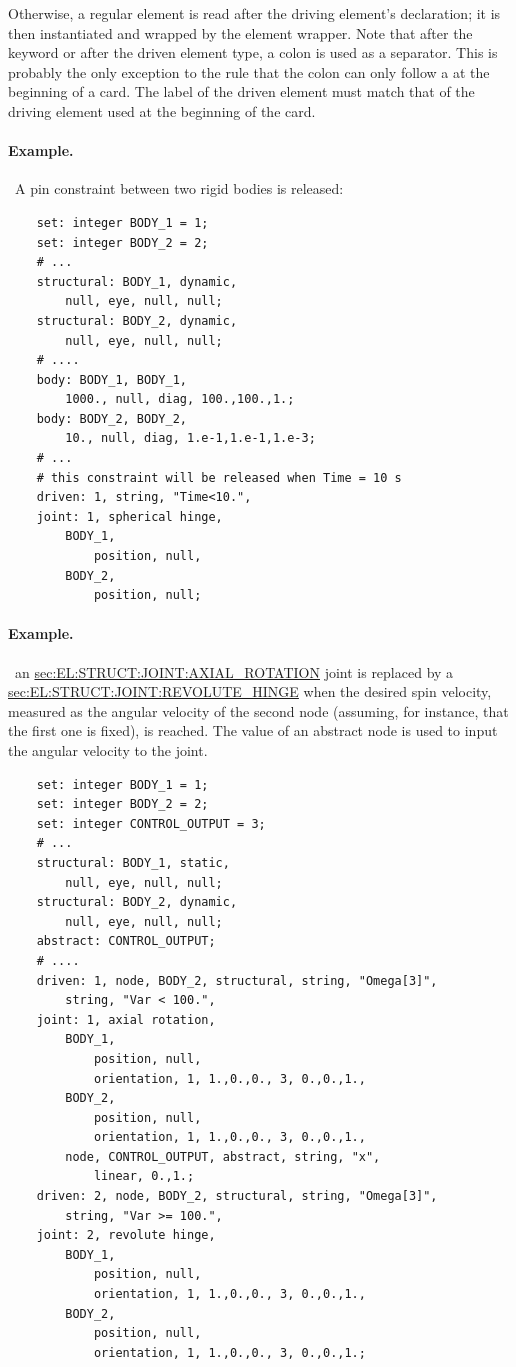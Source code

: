 Otherwise, a regular element is read after the driving element's declaration;
it is then instantiated and wrapped by the  element wrapper.
Note that after the keyword  or after the driven element type,
a colon is used as a separator.
This is probably the only exception to the rule that the colon
can only follow a  at the beginning of a card.
The label  of the driven element must match that
of the driving element used at the beginning of the  card.

\paragraph{Example.} \
A pin constraint between two rigid bodies is released:
\begin{verbatim}
    set: integer BODY_1 = 1;
    set: integer BODY_2 = 2;
    # ...
    structural: BODY_1, dynamic,
        null, eye, null, null;
    structural: BODY_2, dynamic,
        null, eye, null, null;
    # ....
    body: BODY_1, BODY_1,
        1000., null, diag, 100.,100.,1.;
    body: BODY_2, BODY_2,
        10., null, diag, 1.e-1,1.e-1,1.e-3;
    # ...
    # this constraint will be released when Time = 10 s
    driven: 1, string, "Time<10.",
    joint: 1, spherical hinge,
        BODY_1,
            position, null,
        BODY_2,
            position, null;
\end{verbatim}

\paragraph{Example.} \
an
\hyperref{\kw{axial rotation}}{\kw{axial rotation} (see Section~}{)}{sec:EL:STRUCT:JOINT:AXIAL_ROTATION}
joint is replaced by a
\hyperref{\kw{revolute hinge}}{\kw{revolute hinge} (see Section~}{)}{sec:EL:STRUCT:JOINT:REVOLUTE_HINGE}
when the desired spin velocity, measured as the angular velocity
of the second node (assuming, for instance, that the first one is fixed),
is reached.
The value of an abstract node is used to input the angular velocity 
to the  joint.
\begin{verbatim}
    set: integer BODY_1 = 1;
    set: integer BODY_2 = 2;
    set: integer CONTROL_OUTPUT = 3;
    # ...
    structural: BODY_1, static,
        null, eye, null, null;
    structural: BODY_2, dynamic,
        null, eye, null, null;
    abstract: CONTROL_OUTPUT;
    # ....
    driven: 1, node, BODY_2, structural, string, "Omega[3]",
        string, "Var < 100.",
    joint: 1, axial rotation,
        BODY_1,
            position, null,
            orientation, 1, 1.,0.,0., 3, 0.,0.,1.,
        BODY_2,
            position, null,
            orientation, 1, 1.,0.,0., 3, 0.,0.,1.,
        node, CONTROL_OUTPUT, abstract, string, "x",
            linear, 0.,1.;
    driven: 2, node, BODY_2, structural, string, "Omega[3]",
        string, "Var >= 100.",
    joint: 2, revolute hinge,
        BODY_1,
            position, null,
            orientation, 1, 1.,0.,0., 3, 0.,0.,1.,
        BODY_2,
            position, null,
            orientation, 1, 1.,0.,0., 3, 0.,0.,1.;
\end{verbatim}


